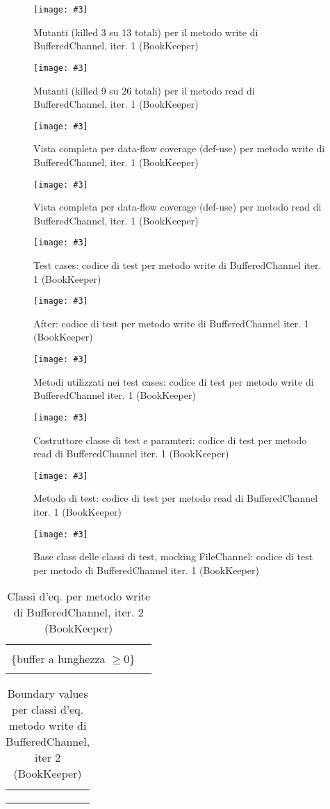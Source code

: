 \documentclass[10pt, a4paper]{article}
\newcommand{\Intmaketable}[4]{
	\begin{longtable}{#3}
	#4
	\caption{#2}
	\label{#1}
	\end{longtable}
}
\newcommand{\Intceqtable}[3]{
	\Intmaketable{#1}{#2}{|l|l|}{
	\hline
	\thead{Parametro formale} & \thead{Classi d'equivalenza} \\
	\hline
	\hline
	#3
	\hline}
}
\newcommand{\Intbvtable}[3]{
	\Intmaketable{#1}{#2}{|l|l|l|}{
	\hline
	\thead{Parametro formale} & \thead{Classe d'equivalenza} & \thead{Boundary value}\\
	\hline
	\hline
	#3
	\hline}
}
\newcommand{\Intceqcaption}[4]{Classi d'eq. per metodo #1 di #2, iter. #3 (#4)}
\newcommand{\Intbvcaption}[4]{Boundary values per classi d'eq. metodo #1 di #2, iter #3 (#4)}
\newcommand{\gettablelabel}[5]{table:#1:#2:#3:iter#4:proj#5}
\newcommand{\ceqtable}[5]{
	\Intceqtable{\gettablelabel{ceq}{#1}{#2}{#3}{#4}}
		{\Intceqcaption{#1}{#2}{#3}{#4}}
		{#5}
}
\newcommand{\bvtable}[5]{
	\Intbvtable{\gettablelabel{bv}{#1}{#2}{#3}{#4}}
		{\Intbvcaption{#1}{#2}{#3}{#4}}
		{#5}
}
\newcommand{\getpicturelabel}[1]{picture:#1}
\newcommand{\makepicture}[4]{
	\begin{figure}[H]
	\centering
	\texttt{[image: \#3]}
	\caption{#4}
	\label{\getpicturelabel{#3}}
	\end{figure}
}
\newcommand{\alldfcovcaption}[4]{Vista completa per data-flow coverage (def-use) per metodo #1 di #2, iter. #3 (#4)}
\newcommand{\mutmethodcaption}[6]{Mutanti (killed #5 su #6 totali) per il metodo #1 di #2, iter. #3 (#4)}
\newcommand{\finishcodecaption}[4]{codice di test per metodo #1 di #2 iter. #3 (#4)}
\newcommand{\tcell}{\makecell[tl]}
\newcommand{\newtrow}{\\ \hline}
\def\bookkeeper{BookKeeper}
\newcommand{\ceq}[1]{\{#1\}}
\begin{document}
	\makepicture{17cm}{10cm}{bk/mutation-write-BufferedChannel-1}
				{\mutmethodcaption{write}{BufferedChannel}{1}{\bookkeeper}{3}{13}}
	
	\makepicture{17cm}{12cm}{bk/mutation-read-BufferedChannel-1}
				{\mutmethodcaption{read}{BufferedChannel}{1}{\bookkeeper}{9}{26}}
				
	\makepicture{13cm}{23cm}{bk/dataflow-write-BufferedChannel-1}
				{\alldfcovcaption{write}{BufferedChannel}{1}{\bookkeeper}}
				
	\makepicture{13cm}{15cm}{bk/dataflow-read-BufferedChannel-1}
				{\alldfcovcaption{read}{BufferedChannel}{1}{\bookkeeper}}
				
	\makepicture{13cm}{16cm}{bk/code-1-write-BufferedChannel-1}
				{Test cases: \finishcodecaption{write}{BufferedChannel}{1}{\bookkeeper}}
				
	\makepicture{10cm}{5cm}{bk/code-2-write-BufferedChannel-1}
				{After: \finishcodecaption{write}{BufferedChannel}{1}{\bookkeeper}}
				
	\makepicture{17cm}{16cm}{bk/code-3-write-BufferedChannel-1}
				{Metodi utilizzati nei test cases: \finishcodecaption{write}{BufferedChannel}{1}{\bookkeeper}}
				
	\makepicture{16cm}{10cm}{bk/code-1-read-BufferedChannel-1}
				{Costruttore classe di test e paramteri: \finishcodecaption{read}{BufferedChannel}{1}{\bookkeeper}}
				
	\makepicture{13cm}{7cm}{bk/code-2-read-BufferedChannel-1}
				{Metodo di test: \finishcodecaption{read}{BufferedChannel}{1}{\bookkeeper}}
				
	\makepicture{16cm}{10cm}{bk/code-1-BaseClass-BufferedChannel-1}
				{Base class delle classi di test, mocking FileChannel: 
				\finishcodecaption{}{BufferedChannel}{1}{\bookkeeper}}
				
	
	\ceqtable{write}{BufferedChannel}{2}{\bookkeeper}{
			\tcell{src} & \tcell{
				\ceq{null}\\
				\ceq{buffer a lunghezza $\ge 0$}}
		\newtrow
	}
				
	\bvtable{write}{BufferedChannel}{2}{\bookkeeper}{
			\tcell{src} & \tcell{\ceq{null}} & \tcell{null}
		\newtrow
			\tcell{src} & \tcell{\ceq{buffer a lunghezza $\ge 0$}} & \tcell{ByteBuf("")}
		\newtrow
	}
	
\end{document}
